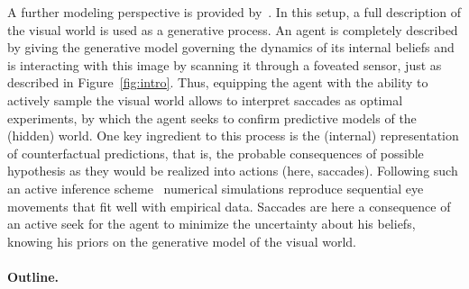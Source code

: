 A further modeling perspective is provided by~\citep{Friston12}. In this setup, a full description of the visual world is used as a generative process. An agent is completely described by giving the generative model governing the dynamics of its internal beliefs and is interacting with this image by scanning it through a foveated sensor, just as described in Figure~\ref{fig:intro}. Thus, equipping the agent with the ability to actively sample the visual world %
allows to interpret saccades as optimal experiments, by which the agent seeks to confirm predictive models of the (hidden) world. One key ingredient to this process is the (internal) representation of counterfactual predictions, that is, the probable consequences of possible hypothesis as they would be realized into actions (here, saccades). Following such an active inference scheme~\citep{Mirza18} numerical simulations reproduce sequential eye movements that fit well with empirical data. %
Saccades %
are here a consequence of an active seek for the agent to minimize the uncertainty about his beliefs, knowing his priors on the generative model of the visual world. 

\paragraph{Outline.}


